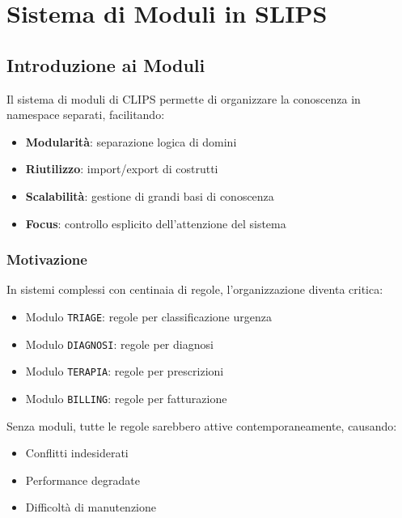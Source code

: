 
\chapter{Sistema di Moduli in SLIPS}
\label{cap:slips_moduli}

\section{Introduzione ai Moduli}

Il sistema di moduli di CLIPS permette di organizzare la conoscenza in namespace separati, facilitando:

\begin{itemize}
\item \textbf{Modularità}: separazione logica di domini
\item \textbf{Riutilizzo}: import/export di costrutti
\item \textbf{Scalabilità}: gestione di grandi basi di conoscenza
\item \textbf{Focus}: controllo esplicito dell'attenzione del sistema
\end{itemize}

\subsection{Motivazione}

In sistemi complessi con centinaia di regole, l'organizzazione diventa critica:

\begin{esempio}
\begin{itemize}
\item Modulo \texttt{TRIAGE}: regole per classificazione urgenza
\item Modulo \texttt{DIAGNOSI}: regole per diagnosi
\item Modulo \texttt{TERAPIA}: regole per prescrizioni
\item Modulo \texttt{BILLING}: regole per fatturazione
\end{itemize}

Senza moduli, tutte le regole sarebbero attive contemporaneamente, causando:
\begin{itemize}
\item Conflitti indesiderati
\item Performance degradate
\item Difficoltà di manutenzione
\end{itemize}
\end{esempio}

